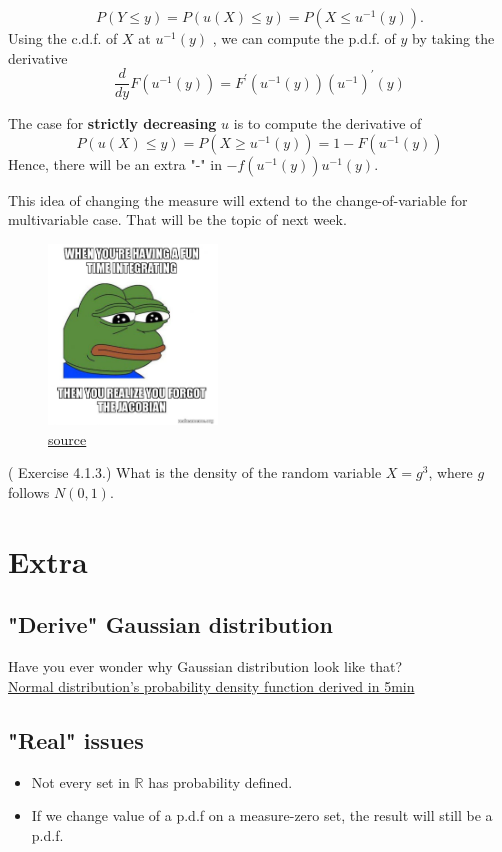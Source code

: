 \[
    P(Y \leq y) = P(u(X) \leq  y) = P(X \leq u^{-1}(y)).
\] 
Using the c.d.f. of \(X\) at \(u^{-1}(y)\) , we can compute the p.d.f. of \(y\) by taking the derivative 
\[
    \frac{d}{dy}F(u^{-1}(y)) = F^\prime (u^{-1}(y))(u^{-1})^\prime (y)
\] 
\begin{remark}
    The case for \textbf{strictly decreasing} \(u\) is to compute the derivative of 
    \[
        P(u(X) \leq y) = P(X \mathbf{\geq } u^{-1}(y)) = 1-F(u^{-1}(y))
    \]  
    Hence, there will be an extra "-" in \(- f(u^{-1}(y)) u^{-1}(y)\).   
\end{remark}

This idea of changing the measure will extend to the change-of-variable for multivariable case. That will be the topic of next week. 
\begin{figure}[h]
    \centering
    \includegraphics[width=0.4\textwidth]{./Figures/Jacobian.png}
    \caption{\href{https://makeameme.org/meme/when-youre-having-592b93}{source}}
    \label{fig:Jacobian-png}
\end{figure}
\begin{eg}
    (\cite{IntroPanchenko} Exercise 4.1.3.) What is the density of the random variable \(X = g^3\), where \(g\) follows \(N(0,1)\).
\end{eg}
\section{Extra}
\subsection*{"Derive" Gaussian distribution}
Have you ever wonder why Gaussian distribution look like that? \\
\href{https://youtu.be/ebewBjZmZTw}{Normal distribution's probability density function derived in 5min}

\subsection*{"Real" issues}
\begin{itemize}
    \item Not every set in \(\mathbb{R}\) has probability defined. 
    \item If we change value of a p.d.f on a measure-zero set, the result will still be a p.d.f.    
\end{itemize}
